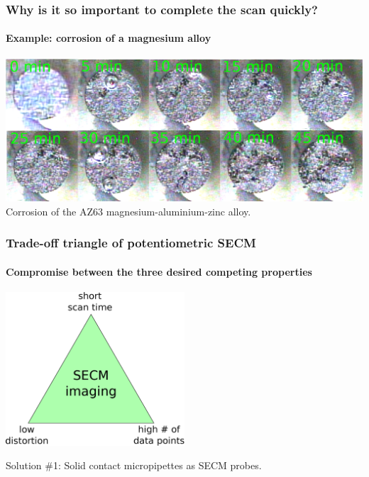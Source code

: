 \documentclass{beamer}
\begin{document}
\begin{frame}
	\frametitle{Why is it so important to complete the scan quickly?}
	\framesubtitle{Example: corrosion of a magnesium alloy}
	\includegraphics[width=1\textwidth]{timelapse.eps}\\
\centering
Corrosion of the AZ63 magnesium-aluminium-zinc alloy.
\end{frame} 

\begin{frame}
\frametitle{Trade-off triangle of potentiometric SECM}
\framesubtitle{Compromise between the three desired competing properties}
\begin{center}
\includegraphics[width=0.5\textwidth]{trade-off.eps}
\end{center}
\end{frame}

\begin{frame}[plain]
\centering
Solution \#1:
Solid contact micropipettes as SECM probes.
\end{frame}
\end{document}
